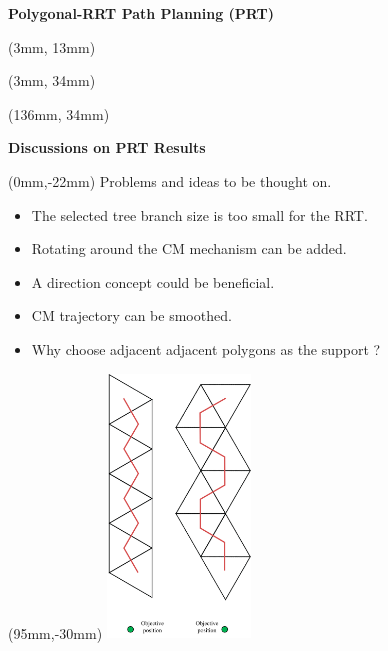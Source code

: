 \documentclass[11pt,aspectratio=169]{beamer}
\begin{document}
\begin{frame}[fragile]{\textbf{Polygonal-RRT Path Planning (PRT)}}
        \begin{textblock*}{5cm}(3mm, 13mm) %
        {\tiny \cite{bb}}
        \end{textblock*}
        
        \begin{textblock*}{5cm}(3mm, 34mm) %
        {\tiny \cite{bb}}
        \end{textblock*}
        
        \begin{textblock*}{5cm}(136mm, 34mm) %
        {\tiny \cite{bb}}
        \end{textblock*}

\end{frame}


\begin{frame}[fragile]{\textbf{Discussions on PRT Results}}

        \begin{textblock*}{130mm}(0mm,-22mm)
        Problems and ideas to be thought on. 
        \medskip
        \begin{itemize}
            \item The selected tree branch size is too small for the RRT.
            \item Rotating around the CM mechanism can be added.
            \item A direction concept could be beneficial.
            \item CM trajectory can be smoothed.
            \item Why choose adjacent adjacent polygons as the support ?
        \end{itemize}
        \end{textblock*}

        \begin{textblock*}{5cm}(95mm,-30mm) %
        \includegraphics[height=70mm]{elements/[19]-PRT.png}
        \end{textblock*}


\end{frame}
\end{document}
